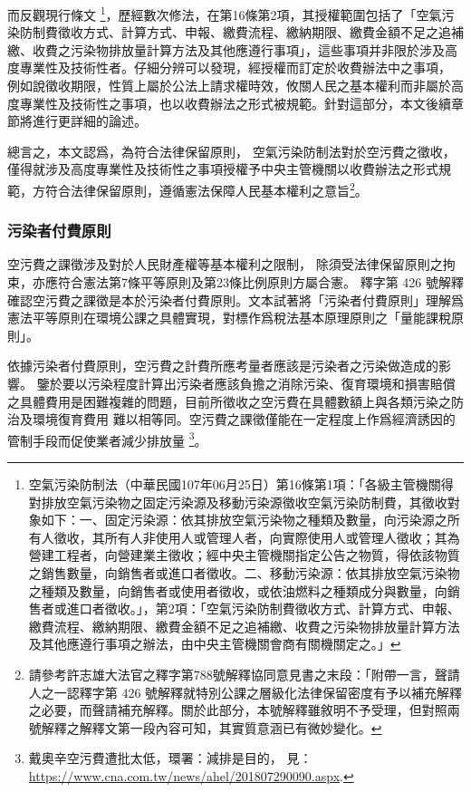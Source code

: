 而反觀現行條文
\footnote{空氣污染防制法（中華民國107年06月25日）第16條第1項：「各級主管機關得對排放空氣污染物之固定污染源及移動污染源徵收空氣污染防制費，其徵收對象如下：一、固定污染源：依其排放空氣污染物之種類及數量，向污染源之所有人徵收，其所有人非使用人或管理人者，向實際使用人或管理人徵收；其為營建工程者，向營建業主徵收；經中央主管機關指定公告之物質，得依該物質之銷售數量，向銷售者或進口者徵收。二、移動污染源：依其排放空氣污染物之種類及數量，向銷售者或使用者徵收，或依油燃料之種類成分與數量，向銷售者或進口者徵收。」，第2項：「空氣污染防制費徵收方式、計算方式、申報、繳費流程、繳納期限、繳費金額不足之追補繳、收費之污染物排放量計算方法及其他應遵行事項之辦法，由中央主管機關會商有關機關定之。」}，歷經數次修法，在第16條第2項，其授權範圍包括了「空氣污染防制費徵收方式、計算方式、申報、繳費流程、繳納期限、繳費金額不足之追補繳、收費之污染物排放量計算方法及其他應遵行事項」，這些事項并非限於涉及高度專業性及技術性者。仔細分辨可以發現，經授權而訂定於收費辦法中之事項，
例如說徵收期限，性質上屬於公法上請求權時效，攸關人民之基本權利而非屬於高度專業性及技術性之事項，也以收費辦法之形式被規範。針對這部分，本文後續章節將進行更詳細的論述。


總言之，本文認爲，為符合法律保留原則，
空氣污染防制法對於空污費之徵收，僅得就涉及高度專業性及技術性之事項授權予中央主管機關以收費辦法之形式規範，方符合法律保留原則，遵循憲法保障人民基本權利之意旨\footnote{請參考許志雄大法官之釋字第788號解釋協同意見書之末段：「附帶一言，聲請人之一認釋字第 426 號解釋就特別公課之層級化法律保留密度有予以補充解釋之必要，而聲請補充解釋。關於此部分，本號解釋雖敘明不予受理，但對照兩號解釋之解釋文第一段內容可知，其實質意涵已有微妙變化。}。

\subsubsection{污染者付費原則}
空污費之課徵涉及對於人民財產權等基本權利之限制，
除須受法律保留原則之拘束，亦應符合憲法第7條平等原則及第23條比例原則方屬合憲。
釋字第 426 號解釋確認空污費之課徵是本於污染者付費原則。文本試著將「污染者付費原則」理解爲憲法平等原則在環境公課之具體實現，對標作爲稅法基本原理原則之「量能課稅原則」。

依據污染者付費原則，空污費之計費所應考量者應該是污染者之污染做造成的影響。
鑒於要以污染程度計算出污染者應該負擔之消除污染、復育環境和損害賠償之具體費用是困難複雜的問題，目前所徵收之空污費在具體數額上與各類污染之防治及環境復育費用
難以相等同。空污費之課徵僅能在一定程度上作爲經濟誘因的管制手段而促使業者減少排放量
\footnote{戴奧辛空污費遭批太低，環署：減排是目的，
見：\url{https://www.cna.com.tw/news/ahel/201807290090.aspx}.}。


